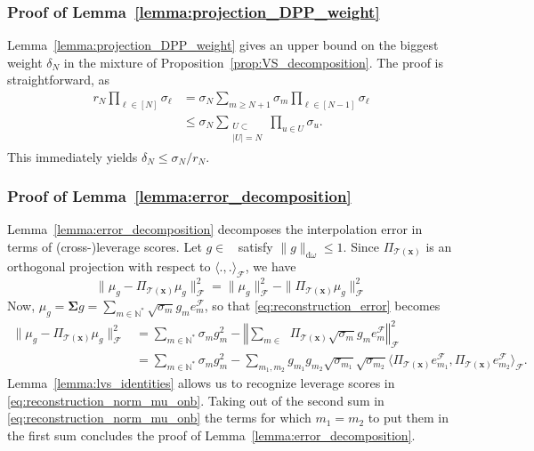 \documentclass[twoside,11pt]{book}
\DeclareMathOperator{\F}{\mathcal{F}}
\DeclareMathOperator{\Ltwo}{\mathbb{L}_{2}(\mathrm{d} \omega)}
\DeclareMathOperator{\Ns}{\mathbb{N}^{*}}
\begin{document}
\subsubsection{Proof of Lemma~\ref{lemma:projection_DPP_weight}}
Lemma~\ref{lemma:projection_DPP_weight} gives an upper bound on the biggest weight $\delta_N$ in the mixture of Proposition~\ref{prop:VS_decomposition}. The proof is straightforward, as
\begin{align}\label{eq:r_N_delta_N_inequality}
r_{N} \prod\limits_{\ell \in [N]} \sigma_{\ell} & = \sigma_{N} \sum\limits_{m \geq N+1} \sigma_{m} \prod\limits_{\ell \in [N-1]} \sigma_{\ell} \nonumber\\
& \leq \sigma_{N} \sum\limits_{\substack{U \subset \Ns\\ |U| = N}} \prod\limits_{u \in U} \sigma_{u}.
\end{align}
This immediately yields $\delta_{N} \leq \sigma_{N}/r_{N}$.

\subsubsection{Proof of Lemma~\ref{lemma:error_decomposition}}\label{app:proof_error_decomposition}
Lemma~\ref{lemma:error_decomposition} decomposes the interpolation error in terms of (cross-)leverage scores. Let $g \in \Ltwo$ satisfy $\|g\|_{\mathrm{d}\omega} \leq 1$. Since $\Pi_{\mathcal{T}(\bm{x})}$ is an orthogonal projection with respect to $\langle .,. \rangle_{\F}$, we have
\begin{equation}\label{eq:reconstruction_error}
\|\mu_{g} - \Pi_{\mathcal{T}(\bm{x})} \mu_{g}\|_{\F}^{2} = \|\mu_{g}\|_{\F}^{2} - \| \Pi_{\mathcal{T}(\bm{x})} \mu_{g}\|_{\F}^2
\end{equation}
Now, $\mu_{g} = \bm{\Sigma} g = \sum\limits_{m \in \mathbb{N}^{*}} \sqrt{\sigma_{m}} g_{m} e_{m}^{\F}$, so that \eqref{eq:reconstruction_error} becomes
\begin{align}
\|\mu_{g} - \Pi_{\mathcal{T}(\bm{x})} \mu_{g}\|_{\F}^{2} & = \sum\limits_{m \in \mathbb{N}^{*}} \sigma_{m} g_{m}^{2} - \left\Vert \sum_{m \in \Ns} \Pi_{\mathcal{T}(\bm{x})}  \sqrt{\sigma_{m}} g_{m} e_{m}^{\F}\right\Vert_{\F}^2 \nonumber\\
& = \sum\limits_{m \in \mathbb{N}^{*}} \sigma_{m} g_{m}^{2} - \sum\limits_{m_{1}, m_2} g_{m_{1}} g_{m_{2}} \sqrt{\sigma_{m_{1}}} \sqrt{\sigma_{m_{2}}} \langle  \Pi_{\mathcal{T}(\bm{x})}   e_{m_{1}}^{\F}, \Pi_{\mathcal{T}(\bm{x})} e_{m_{2}}^{\F} \rangle_{\F}. \label{eq:reconstruction_norm_mu_onb}
\end{align}
Lemma~\ref{lemma:lvs_identities} allows us to recognize leverage scores in \eqref{eq:reconstruction_norm_mu_onb}. Taking out of the second sum in \eqref{eq:reconstruction_norm_mu_onb} the terms for which $m_1=m_2$ to put them in the first sum concludes the proof of Lemma~\ref{lemma:error_decomposition}.
\end{document}
